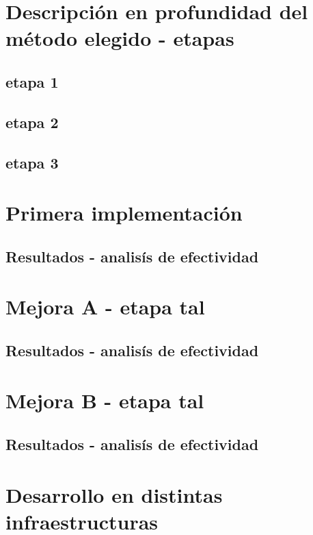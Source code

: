 \documentclass[conference]{IEEEtran}
\begin{document}
\section{Descripción en profundidad del método elegido - etapas}

\subsection{etapa 1}

\subsection{etapa 2}

\subsection{etapa 3}

\section{Primera implementación}

\subsection{Resultados - analisís de efectividad}

\section{Mejora A - etapa tal}

\subsection{Resultados - analisís de efectividad}

\section{Mejora B - etapa tal}

\subsection{Resultados - analisís de efectividad}

\section{Desarrollo en distintas infraestructuras}
\end{document}

